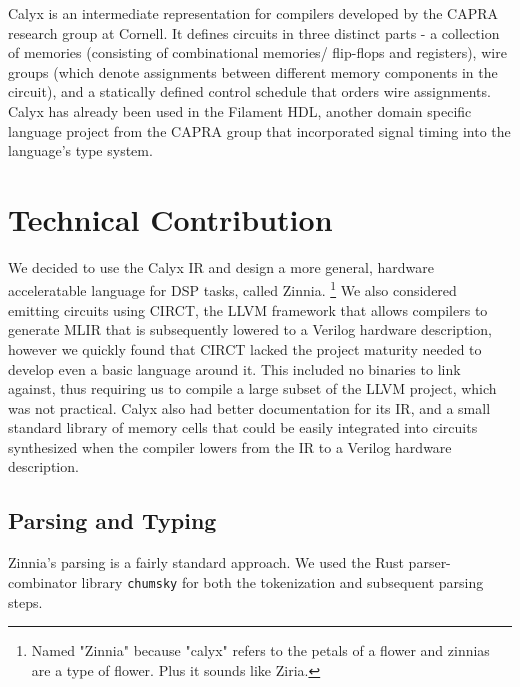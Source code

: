 \documentclass[12pt]{article}
\begin{document}
Calyx \cite{nigam_compiler_2021} is an intermediate representation for compilers developed by the CAPRA research group at Cornell.
It defines circuits in three distinct parts - a collection of memories (consisting of combinational memories/
flip-flops and registers), wire groups (which denote assignments between different memory components
in the circuit), and a statically defined control schedule that orders wire assignments.
Calyx has already been used in the Filament HDL, another domain specific language project from the CAPRA
group that incorporated signal timing into the language's type system.

\section{Technical Contribution}
We decided to use the Calyx IR and design a more general, hardware acceleratable language for DSP tasks, called Zinnia.
\footnote{Named "Zinnia" because "calyx" refers to the petals of a flower and zinnias are a type of flower. Plus it sounds like Ziria.}
We also considered emitting circuits using CIRCT, the LLVM framework that allows compilers to generate
MLIR that is subsequently lowered to a Verilog hardware description, however we quickly found that
CIRCT lacked the project maturity needed to develop even a basic language around it. This included
no binaries to link against, thus requiring us to compile a large subset of the LLVM project, which was not practical.
Calyx also had better documentation for its IR, and a small standard library of memory cells that could be easily integrated
into circuits synthesized when the compiler lowers from the IR to a Verilog hardware description.

\subsection{Parsing and Typing}
Zinnia's parsing is a fairly standard approach. We used the Rust parser-combinator library \texttt{chumsky} for both the tokenization and subsequent parsing steps.
\end{document}
